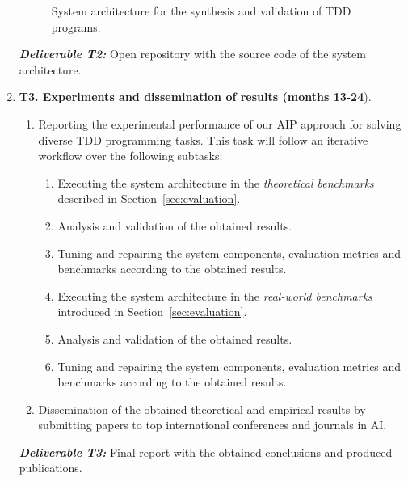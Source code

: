 \documentclass[10pt,a4paper]{paper}
\begin{document}
\begin{enumerate}
\begin{figure}[hbt!]
\begin{center}
\end{center}  
\caption{\small System architecture for the synthesis and validation of TDD programs.}
\label{fig:architecture}
\end{figure}

{\small{\bf\em Deliverable T2:} Open repository with the source code of the system architecture.}
    
\item {\bf T3. Experiments and dissemination of results (months 13-24}).
   \begin{small}
      \begin{enumerate}
      \item Reporting the experimental performance of our AIP approach for solving diverse TDD programming tasks. This task will follow an iterative workflow over the following subtasks:
      \begin{enumerate}
      \item Executing the system architecture in the {\em theoretical benchmarks} described in Section~\ref{sec:evaluation}.
      \item Analysis and validation of the obtained results.
      \item Tuning and repairing the system components, evaluation metrics and benchmarks according to the obtained results.                 
      \item Executing the system architecture in the {\em real-world benchmarks} introduced in Section~\ref{sec:evaluation}.
      \item Analysis and validation of the obtained results.         
      \item Tuning and repairing the system components, evaluation metrics and benchmarks according to the obtained results.                 
      \end{enumerate}
      \item Dissemination of the obtained theoretical and empirical results by submitting papers to top international conferences and journals in AI.        
      \end{enumerate}
\end{small}        
{\small{\bf\em  Deliverable T3:} Final report with the obtained conclusions and produced publications.}
\end{enumerate}
\end{document}
